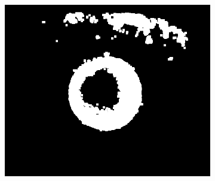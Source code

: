 \documentclass{article}
\begin{document}
\begin{figure}[H]
\begin{subfigure}{.09\textwidth}
  \label{fig:arrow}
\end{subfigure}%
\begin{subfigure}{.47\textwidth}
  \centering
  \includegraphics[width=0.97\linewidth]{_Figures/raw_data_3_dilation.png}
  \caption{}
  \label{fig:raw_3_dilation}
\end{subfigure}



\end{figure}
\end{document}
